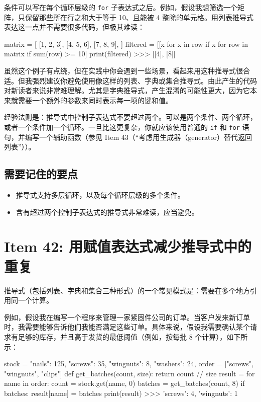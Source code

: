 条件可以写在每个循环层级的 \texttt{for} 子表达式之后。例如，假设我想筛选一个矩阵，只保留那些所在行之和大于等于 10、且能被 4 整除的单元格。用列表推导式表达这一点并不需要很多代码，但极其难读：

\begin{codebox}[python]
matrix = [
    [1, 2, 3],
    [4, 5, 6],
    [7, 8, 9],
]
filtered = [[x for x in row if x %
            for row in matrix if sum(row) >= 10]
print(filtered)
>>>
[[4], [8]]
\end{codebox}

虽然这个例子有点绕，但在实践中你会遇到一些场景，看起来用这种推导式很合适。但我强烈建议你避免使用像这样的列表、字典或集合推导式。由此产生的代码对新读者来说非常难理解。尤其是字典推导式，产生混淆的可能性更大，因为它本来就需要一个额外的参数来同时表示每一项的键和值。

经验法则是：推导式中控制子表达式不要超过两个。可以是两个条件、两个循环，或者一个条件加一个循环。一旦比这更复杂，你就应该使用普通的 \texttt{if} 和 \texttt{for} 语句，并编写一个辅助函数（参见 Item 43（``考虑用生成器（generator）替代返回列表''））。

\subsection{需要记住的要点}

\begin{itemize}
\item 推导式支持多层循环，以及每个循环层级的多个条件。
\item 含有超过两个控制子表达式的推导式非常难读，应当避免。
\end{itemize}

\section{Item 42: 用赋值表达式减少推导式中的重复}

推导式（包括列表、字典和集合三种形式）的一个常见模式是：需要在多个地方引用同一个计算。

例如，假设我在编写一个程序来管理一家紧固件公司的订单。当客户发来新订单时，我需要能够告诉他们我能否满足这些订单。具体来说，假设我需要确认某个请求有足够的库存，并且高于发货的最低阈值（例如，按每批 8 个计算），如下所示：

\begin{codebox}[python]
stock = {
    "nails": 125,
    "screws": 35,
    "wingnuts": 8,
    "washers": 24,
}
order = ["screws", "wingnuts", "clips"]
def get_batches(count, size):
    return count // size
result = {}
for name in order:
    count = stock.get(name, 0)
    batches = get_batches(count, 8)
    if batches:
        result[name] = batches
print(result)
>>>
{'screws': 4, 'wingnuts': 1}
\end{codebox}

